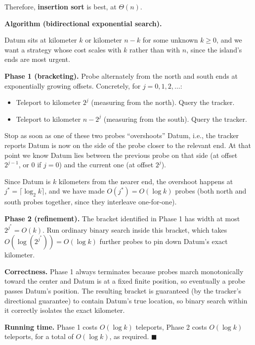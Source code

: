 \documentclass[12pt,twoside]{article}
\begin{document}
\begin{problems}
\begin{problemparts}
Therefore, \textbf{insertion sort} is best, at $\Theta(n)$.

\end{problemparts}

\newpage
\problem  %

\textbf{Algorithm (bidirectional exponential search).}

Datum sits at kilometer $k$ or kilometer $n-k$ for some unknown $k \ge 0$, and we want a strategy
whose cost scales with $k$ rather than with $n$, since the island's ends are most urgent.

\textbf{Phase 1 (bracketing).}
Probe alternately from the north and south ends at exponentially growing offsets. Concretely, for
$j = 0, 1, 2, \dots$:
\begin{itemize}
  \item Teleport to kilometer $2^j$ (measuring from the north). Query the tracker.
  \item Teleport to kilometer $n - 2^j$ (measuring from the south). Query the tracker.
\end{itemize}
Stop as soon as one of these two probes ``overshoots'' Datum, i.e., the tracker reports Datum is
now on the side of the probe closer to the relevant end. At that point we know Datum lies
between the previous probe on that side (at offset $2^{j-1}$, or $0$ if $j = 0$) and the current
one (at offset $2^j$).

Since Datum is $k$ kilometers from the nearer end, the overshoot happens at
$j^\ast = \lceil \log_2 k \rceil$, and we have made $O(j^\ast) = O(\log k)$ probes (both north
and south probes together, since they interleave one-for-one).

\textbf{Phase 2 (refinement).}
The bracket identified in Phase 1 has width at most $2^{j^\ast} = O(k)$. Run ordinary binary
search inside this bracket, which takes $O(\log(2^{j^\ast})) = O(\log k)$ further probes to pin
down Datum's exact kilometer.

\textbf{Correctness.} Phase 1 always terminates because probes march monotonically toward the
center and Datum is at a fixed finite position, so eventually a probe passes Datum's position.
The resulting bracket is guaranteed (by the tracker's directional guarantee) to contain Datum's
true location, so binary search within it correctly isolates the exact kilometer.

\textbf{Running time.} Phase 1 costs $O(\log k)$ teleports, Phase 2 costs $O(\log k)$ teleports,
for a total of $O(\log k)$, as required. $\blacksquare$


\end{problems}
\end{document}
